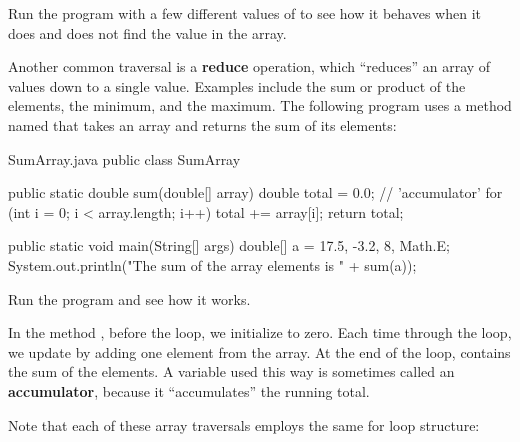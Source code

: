 Run the program with a few different values of  to see how it behaves when it does and does not find the value in the array.

%



Another common traversal is a {\bf reduce} operation, which ``reduces'' an array of values down to a single value.
Examples include the sum or product of the elements, the minimum, and the maximum.
The following program uses a method named  that takes an array and returns the sum of its elements:

\begin{trinket} [320] {SumArray.java}
public class SumArray {

    public static double sum(double[] array) {
        double total = 0.0;  // 'accumulator'
        for (int i = 0; i < array.length; i++) {
            total += array[i];
        }
        return total;
    }   
     
    public static void main(String[] args) {
       double[] a = {17.5, -3.2, 8, Math.E};
       System.out.println("The sum of the array elements is " + sum(a));             
    }
}
\end{trinket}

Run the program and see how it works.


In the method , before the loop, we initialize  to zero.
Each time through the loop, we update  by adding one element from the array.
At the end of the loop,  contains the sum of the elements.
A variable used this way is sometimes called an {\bf accumulator}, because it ``accumulates'' the running total.

Note that each of these array traversals employs the same for loop structure:

